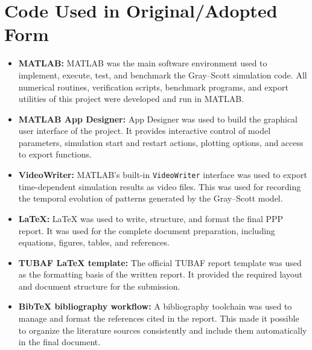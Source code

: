 \chapter{Code Used in Original/Adopted Form}
\label{sec:code_used_external_software}

\begin{itemize}
    \item \textbf{MATLAB:} MATLAB was the main software environment used to implement, execute, test, and benchmark the Gray--Scott simulation code. All numerical routines, verification scripts, benchmark programs, and export utilities of this project were developed and run in MATLAB.

    \item \textbf{MATLAB App Designer:} App Designer was used to build the graphical user interface of the project. It provides interactive control of model parameters, simulation start and restart actions, plotting options, and access to export functions.

    \item \textbf{VideoWriter:} MATLAB's built-in \texttt{VideoWriter} interface was used to export time-dependent simulation results as video files. This was used for recording the temporal evolution of patterns generated by the Gray--Scott model.

    \item \textbf{\LaTeX:} \LaTeX{} was used to write, structure, and format the final PPP report. It was used for the complete document preparation, including equations, figures, tables, and references.

    \item \textbf{TUBAF \LaTeX{} template:} The official TUBAF report template was used as the formatting basis of the written report. It provided the required layout and document structure for the submission.

    \item \textbf{Bib\TeX{} bibliography workflow:} A bibliography toolchain was used to manage and format the references cited in the report. This made it possible to organize the literature sources consistently and include them automatically in the final document.
\end{itemize}